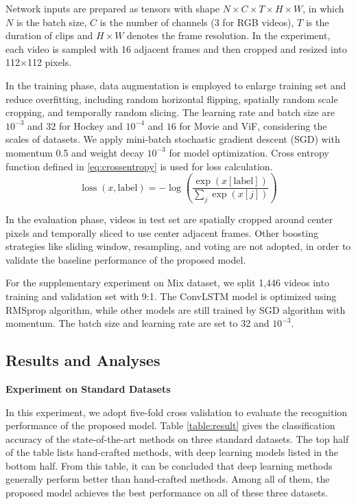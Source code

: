 \documentclass[10pt,twocolumn,letterpaper]{article}
\begin{document}
Network inputs are prepared as tensors with shape $N \times C \times T \times H \times W$, in which $N$ is the batch size, $C$ is the number of channels (3 for RGB videos), $T$ is the duration of clips and $H \times W$ denotes the frame resolution. 
In the experiment, each video is sampled with 16 adjacent frames and then cropped and resized into 112$\times$112 pixels.

In the training phase, data augmentation is employed to enlarge training set and reduce overfitting, including random horizontal flipping, spatially random scale cropping, and temporally random slicing. 
The learning rate and batch size are $10^{-3}$ and $32$ for Hockey and $10^{-4}$ and $16$ for Movie and ViF, considering the scales of datasets.
We apply mini-batch stochastic gradient descent (SGD) with momentum 0.5 and weight decay $10^{-3}$ for model optimization.  
Cross entropy function defined in \ref{eq:crossentropy} is used for loss calculation. 
\begin{equation}
\label{eq:crossentropy}
\operatorname{loss}(x, \text{label}) = -\log \left(\frac{\exp (x[\text{label}])}{\sum_{j} \exp (x[j])}\right)
\end{equation}

In the evaluation phase, videos in test set are spatially cropped around center pixels and temporally sliced to use center adjacent frames.
Other boosting strategies like sliding window, resampling, and voting are not adopted, in order to validate the baseline performance of the proposed model.

For the supplementary experiment on Mix dataset, we split 1,446 videos into training and validation set with 9:1. 
The ConvLSTM \cite{convlstm_sudh} model is optimized using RMSprop algorithm, while other models are still trained by SGD algorithm with momentum.
The batch size and learning rate are set to 32 and $10^{-3}$.

\subsection{Results and Analyses}

\noindent\textbf{Experiment on Standard Datasets}

In this experiment, we adopt five-fold cross validation to evaluate the recognition performance of the proposed model.
Table \ref{table:result} gives the classification accuracy of the state-of-the-art methods on three standard datasets.
The top half of the table lists hand-crafted methods, with deep learning models listed in the bottom half.
From this table, it can be concluded that deep learning methods generally perform better than hand-crafted methods.
Among all of them, the proposed model achieves the best performance on all of these three datasets.
\end{document}
